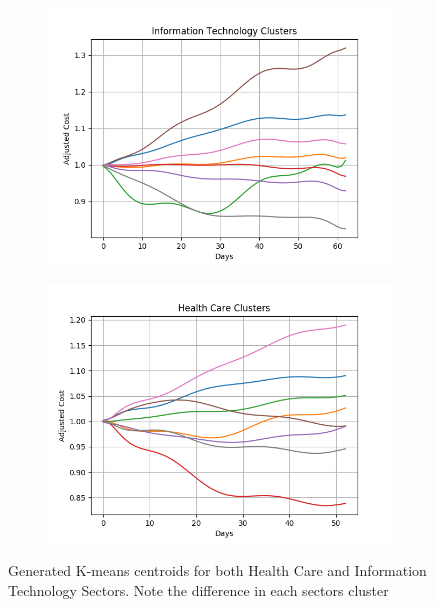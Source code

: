 \documentclass{article}
\begin{document}
\begin{figure}[ht]
\centering
\begin{subfigure}{.45\textwidth}
  \centering
  \includegraphics[width=\linewidth]{informationtechnology.png}
  \caption{}
  \label{kmeans:a}
\end{subfigure}%
\begin{subfigure}{.45\textwidth}
  \centering
  \includegraphics[width=\linewidth]{healthcare.png}
  \caption{}
  \label{kmeans:b}
\end{subfigure}
\caption{Generated K-means centroids for both Health Care and Information Technology Sectors. Note the difference in each sectors cluster}
\label{markov}
\end{figure}
\end{document}
